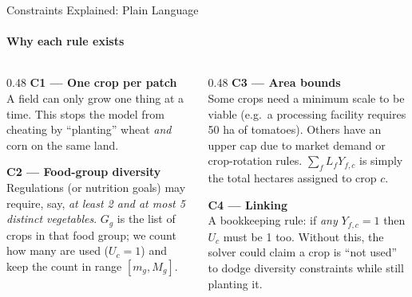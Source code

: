 \begin{frame}{Constraints Explained: Plain Language}
    \framesubtitle{Why each rule exists}

    \begin{columns}[T]
        \begin{column}{0.48\textwidth}
            \textbf{\textcolor{primaryBlue}{C1 — One crop per patch}}\\[4pt]
            A field can only grow one thing at a time.
            This stops the model from cheating by
            ``planting'' wheat \emph{and} corn on the same land.

            \vspace{0.5cm}
            \textbf{\textcolor{accentTeal}{C2 — Food-group diversity}}\\[4pt]
            Regulations (or nutrition goals) may require, say,
            \emph{at least 2 and at most 5 distinct vegetables}.
            $G_g$ is the list of crops in that food group;
            we count how many are used ($U_c=1$) and keep
            the count in range $[m_g, M_g]$.
        \end{column}
        \begin{column}{0.48\textwidth}
            \textbf{\textcolor{accentGreen}{C3 — Area bounds}}\\[4pt]
            Some crops need a minimum scale to be viable
            (e.g.\ a processing facility requires 50 ha of tomatoes).
            Others have an upper cap due to market demand or
            crop-rotation rules. $\sum_f L_f Y_{f,c}$ is simply the
            total hectares assigned to crop $c$.

            \vspace{0.5cm}
            \textbf{\textcolor{warmOrange}{C4 — Linking}}\\[4pt]
            A bookkeeping rule: if \emph{any} $Y_{f,c}=1$ then
            $U_c$ must be 1 too. Without this, the solver could
            claim a crop is ``not used'' to dodge diversity
            constraints while still planting it.
        \end{column}
    \end{columns}
\end{frame}


